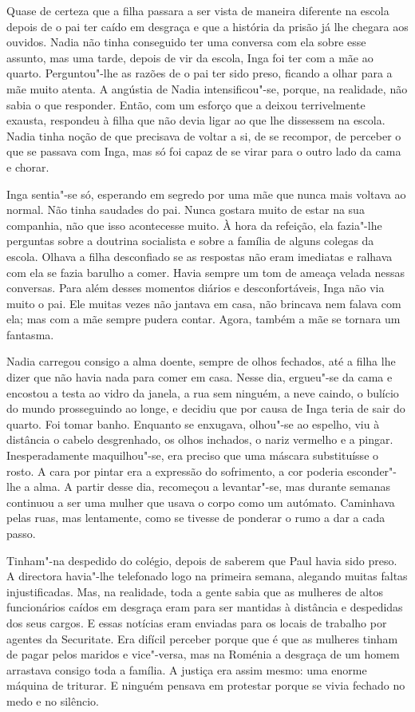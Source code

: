 Quase de certeza que a filha passara a ser vista de maneira diferente na
escola depois de o pai ter caído em desgraça e que a história da prisão
já lhe chegara aos ouvidos. Nadia não tinha conseguido ter uma conversa
com ela sobre esse assunto, mas uma tarde, depois de vir da escola, Inga
foi ter com a mãe ao quarto. Perguntou"-lhe as razões de o pai ter sido
preso, ficando a olhar para a mãe muito atenta. A angústia de Nadia
intensificou"-se, porque, na realidade, não sabia o que responder. Então,
com um esforço que a deixou terrivelmente exausta, respondeu à filha
que não devia ligar ao que lhe dissessem na escola. Nadia tinha noção de
que precisava de voltar a si, de se recompor, de perceber o que se
passava com Inga, mas só foi capaz de se virar para o outro lado da cama
e chorar.

Inga sentia"-se só, esperando em segredo por uma mãe
que nunca mais voltava ao normal. Não tinha saudades do pai. Nunca
gostara muito de estar na sua companhia, não que isso acontecesse muito.
À hora da refeição, ela fazia"-lhe perguntas sobre a doutrina socialista e sobre a família de alguns
colegas da escola. Olhava a filha desconfiado se as respostas não eram
imediatas e ralhava com ela se fazia barulho a comer. Havia sempre um
tom de ameaça velada nessas conversas. Para além desses momentos diários
e desconfortáveis, Inga não via muito o pai. Ele muitas vezes não
jantava em casa, não brincava nem falava com ela; mas com a mãe sempre
pudera contar. Agora, também a mãe se tornara um fantasma.

Nadia carregou consigo a alma doente, sempre de olhos fechados, até a
filha lhe dizer que não havia nada para comer em casa. Nesse dia,
ergueu"-se da cama e encostou a testa ao vidro da janela, a rua sem
ninguém, a neve caindo, o bulício do mundo prosseguindo ao longe, e
decidiu que por causa de Inga teria de sair do quarto. Foi tomar banho.
Enquanto se enxugava, olhou"-se ao espelho, viu à distância o cabelo
desgrenhado, os olhos inchados, o nariz vermelho e a pingar.
Inesperadamente maquilhou"-se, era preciso que uma máscara substituísse o rosto. A cara por pintar
era a expressão do sofrimento, a cor poderia esconder"-lhe a alma. A
partir desse dia, recomeçou a levantar"-se, mas durante semanas continuou
a ser uma mulher que usava o corpo como um autómato. Caminhava pelas
ruas, mas lentamente, como se tivesse de ponderar o rumo a dar a cada
passo.

Tinham"-na despedido do colégio, depois de saberem que Paul havia sido
preso. A directora havia"-lhe telefonado logo na primeira semana,
alegando muitas faltas injustificadas. Mas, na realidade, toda a gente
sabia que as mulheres de altos funcionários caídos em desgraça eram para ser mantidas à
distância e despedidas dos seus cargos. E essas notícias eram enviadas
para os locais de trabalho por agentes da Securitate. Era difícil
perceber porque que é que as mulheres tinham de pagar pelos maridos e
vice"-versa, mas na Roménia a desgraça de um homem arrastava consigo
toda a família. A justiça era assim mesmo: uma enorme máquina de
triturar. E ninguém pensava em protestar porque se vivia fechado no
medo e no silêncio.

